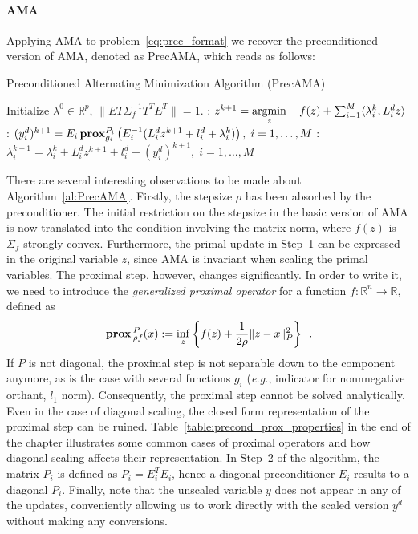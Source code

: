 \documentclass[openany]{now}
\newcommand{\eg}{{\it e.g.}}
\newcommand{\reals}{{\mathbb R}}
\newcommand{\argmin}{\mathop{\rm argmin}}
\newcommand{\prox}{\mathop{\bf prox}}
\begin{document}
\paragraph*{AMA} Applying AMA to problem~\eqref{eq:prec_format} we recover the preconditioned version of AMA, denoted as PrecAMA, which reads as follows:
\begin{algorithm}[H]
\caption{Preconditioned Alternating Minimization Algorithm (PrecAMA)}
\label{al:PrecAMA}
\begin{algorithmic} 
\REQUIRE Initialize $\lambda^{0}\in \reals^{p}$, $\|ET\Sigma_f^{-1}T^TE^T\|=1$.
\LOOP
{}: $z^{k+1} = \argmin\limits_z \quad f(z) + \sum_{i=1}^M \langle  \lambda_i^k, L^d_i z\rangle $
: $(y_i^d)^{k+1} = E_i \prox^{P_i}_{g_i}\left(E_i^{-1}(L^d_iz^{k+1}+l^d_i+\lambda_i^k)\right), \; i=1,\ldots,M$
: $\lambda^{k+1}_i = \lambda_i^k + L^d_i z^{k+1} + l^d_i - (y_i^d)^{k+1},\; i=1,\ldots,M$
\ENDLOOP
\end{algorithmic}
\end{algorithm}\begin{footnotesize}
\end{footnotesize}
  There are several interesting observations to be made about Algorithm~\ref{al:PrecAMA}. Firstly, the stepsize $\rho$ has been absorbed by the preconditioner. The initial restriction on the stepsize in the basic version of AMA is now translated into the condition involving the matrix norm, where $f(z)$ is $\Sigma_f$-strongly convex. Furthermore, the primal update in Step~1 can be expressed in the original variable $z$, since AMA is invariant when scaling the primal variables.
  The proximal step, however, changes significantly. In order to write it, we need to introduce the \emph{generalized proximal operator} for a function $f:\reals^n\rightarrow \overline\reals$, defined as 
  \begin{equation}{\label{eq::genProx}}
  \prox{_{\rho f}^{P}}(x):= \inf\limits_{z}\left\{f(z)+\frac{1}{2\rho}\|z-x\|_P^2\right\}\enspace. 
  \end{equation}
  If $P$ is not diagonal, the proximal step is not separable down to the component anymore, as is the case with several functions $g_i$ (\eg, indicator for nonnnegative orthant, $l_1$ norm). Consequently, the proximal step cannot be solved analytically. Even in the case of diagonal scaling, the closed form representation of the proximal step can be ruined. Table~\ref{table:precond_prox_properties} in the end of the chapter illustrates some common cases of proximal operators and how diagonal scaling affects their representation. In Step~2 of the algorithm, the matrix $P_i$ is defined as $P_i=E_i^TE_i$, hence a diagonal preconditioner $E_i$ results to a diagonal $P_i$. Finally, note that the unscaled variable $y$ does not appear in any of the updates, conveniently allowing us to work directly with the scaled version $y^d$ without making any conversions.
\end{document}
